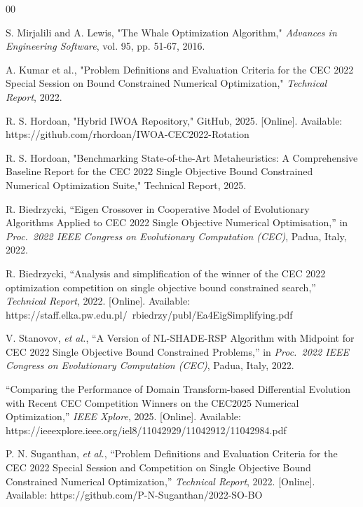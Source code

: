 \documentclass[conference]{IEEEtran}
\begin{document}

\begin{thebibliography}{00}

S. Mirjalili and A. Lewis, "The Whale Optimization Algorithm," \textit{Advances in Engineering Software}, vol. 95, pp. 51-67, 2016.

A. Kumar et al., "Problem Definitions and Evaluation Criteria for the CEC 2022 Special Session on Bound Constrained Numerical Optimization," \textit{Technical Report}, 2022.

R. S. Hordoan, "Hybrid IWOA Repository," GitHub, 2025. [Online]. Available: https://github.com/rhordoan/IWOA-CEC2022-Rotation

R. S. Hordoan, "Benchmarking State-of-the-Art Metaheuristics: A Comprehensive Baseline Report for the CEC 2022 Single Objective Bound Constrained Numerical Optimization Suite," Technical Report, 2025.

R. Biedrzycki, ``Eigen Crossover in Cooperative Model of Evolutionary Algorithms Applied to CEC 2022 Single Objective Numerical Optimisation,'' in \emph{Proc.\ 2022 IEEE Congress on Evolutionary Computation (CEC)}, Padua, Italy, 2022.

R. Biedrzycki, ``Analysis and simplification of the winner of the CEC 2022 optimization competition on single objective bound constrained search,'' \emph{Technical Report}, 2022. [Online]. Available: https://staff.elka.pw.edu.pl/~rbiedrzy/publ/Ea4EigSimplifying.pdf

V. Stanovov, \emph{et al.}, ``A Version of NL-SHADE-RSP Algorithm with Midpoint for CEC 2022 Single Objective Bound Constrained Problems,'' in \emph{Proc.\ 2022 IEEE Congress on Evolutionary Computation (CEC)}, Padua, Italy, 2022.

``Comparing the Performance of Domain Transform-based Differential Evolution with Recent CEC Competition Winners on the CEC2025 Numerical Optimization,'' \emph{IEEE Xplore}, 2025. [Online]. Available: https://ieeexplore.ieee.org/iel8/11042929/11042912/11042984.pdf

P. N. Suganthan, \emph{et al.}, ``Problem Definitions and Evaluation Criteria for the CEC 2022 Special Session and Competition on Single Objective Bound Constrained Numerical Optimization,'' \emph{Technical Report}, 2022. [Online]. Available: https://github.com/P-N-Suganthan/2022-SO-BO

\end{thebibliography}
\end{document}
